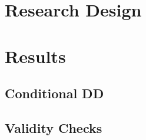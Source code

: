 \section{Research Design}







\section{Results}
\subsection{Conditional DD}



\subsection{Validity Checks}


